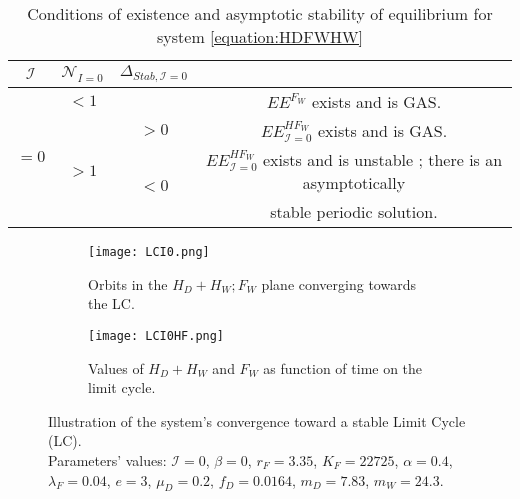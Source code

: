 \documentclass{article}
\newcommand{\lfw}{\lambda_{F}}
\newcommand{\lfw}{\lambda_{F}}
\newcommand{\cI}{\mathcal{I}}
\begin{document}

\begin{table}[!ht]
\centering
\def\arraystretch{2}
\begin{tabular}{c|c|c|c}
$\cI$  & $\mathcal{N}_{I =0}$ &  $\Delta_{Stab, \cI =0}$ & \\
\hline
\multirow{4}{*}{$=0$}& $ < 1$ & &$EE^{F_W}$ exists and is GAS.  \\
\cline{2-4}
 &  \multirow{3}{*}{$> 1$} & $ >0$ &$EE^{HF_W}_{\cI=0}$ exists and is GAS.\\
 \cline{3-4}
 &  &\multirow{2}{*}{$ <0 $} & $EE^{HF_W}_{\cI=0}$ exists and is unstable ; there is an asymptotically \\
&  & &  stable periodic solution.
\end{tabular}
\caption{\centering Conditions of existence and asymptotic stability of equilibrium for system \eqref{equation:HDFWHW}}
\label{table:long term dynamic, I = 0}
\end{table}

\begin{figure}[!ht]
\begin{subfigure}{0.45\textwidth}
\centering
\texttt{[image: LCI0.png]}
\caption{\centering Orbits in the $H_D + H_W ; F_W$ plane converging towards the LC.}
\label{fig:LCI0, 1}
\end{subfigure}
\begin{subfigure}{0.45\textwidth}
\centering
\texttt{[image: LCI0HF.png]}
\caption{\centering Values of $H_D + H_W$ and $F_W$ as function of time on the limit cycle.}
\label{fig:LCI0, 2}
\end{subfigure}
\caption{ \centering Illustration of the system's convergence toward a stable Limit Cycle (LC). \\
Parameters' values: $\cI = 0$, $\beta = 0$, $r_F = 3.35$, $K_F = 22725$, $\alpha = 0.4$, $\lfw = 0.04$, $e = 3$, $\mu_D = 0.2$, $f_D = 0.0164$, $m_D = 7.83$, $m_W = 24.3$.}
\end{figure}
\end{document}
